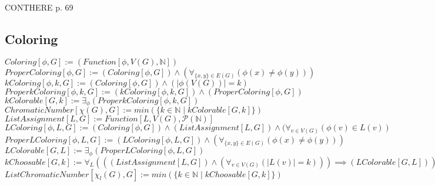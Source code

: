 \documentclass{book}
\newcommand{\abr}{:=}
\newcommand{\st}{\mathbin{|}}
\newcommand{\utup}[1]{\{#1\}}
\begin{document}
CONTHERE p. 69 


\subsection{Coloring}
$Coloring[\phi, G] \abr (Function[\phi, V(G), \mathbb{N}])$ \\
$ProperColoring[\phi, G] \abr (Coloring[\phi, G]) \land (\forall_{\utup{x, y} \in E(G)}(\phi(x) \neq \phi(y)))$ \\
$kColoring[\phi, k, G] \abr (Coloring[\phi, G]) \land (|\phi(V(G))| =  k)$ \\
$ProperkColoring[\phi, k, G] \abr (kColoring[\phi, k, G]) \land (ProperColoring[\phi, G])$ \\
$kColorable[G, k] \abr \exists_{\phi}(ProperkColoring[\phi, k, G])$ \\
$ChromaticNumber[\chi(G), G] \abr min(\{k \in \mathbb{N} \st kColorable[G, k]\})$ \\

$ListAssignment[L, G] \abr Function[L, V(G), \mathcal{P}(\mathbb{N})]$ \\
$LColoring[\phi, L, G] \abr (Coloring[\phi, G]) \land (ListAssignment[L, G]) \land (\forall_{v \in V(G)}(\phi(v) \in L(v))$ \\
$ProperLColoring[\phi, L, G] \abr (LColoring[\phi, L, G]) \land (\forall_{\utup{x, y} \in E(G)}(\phi(x) \neq \phi(y)))$ \\
$LColorable[G, L] \abr \exists_{\phi}(ProperLColoring[\phi, L, G])$ \\
$kChoosable[G, k] \abr \forall_{L}(((ListAssignment[L, G]) \land (\forall_{v \in V(G)}(|L(v)| = k))) \implies (LColorable[G, L]))$ \\
$ListChromaticNumber[\chi_l(G), G] \abr min(\{k \in \mathbb{N} \st kChoosable[G, k]\})$ \\



\end{document}
